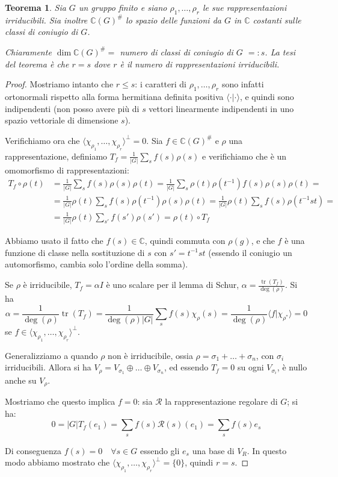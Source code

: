 \documentclass[11pt]{article}
\theoremstyle{plain}
\newtheorem{thm}{Teorema}[section]
\theoremstyle{definition}
\theoremstyle{remark}
\newcommand{\C}{\mathbb{C}}
\newcommand{\dsum}{\displaystyle\sum}
\DeclareMathOperator{\tr}{tr}
\begin{document}
\begin{thm} Sia $G$ un gruppo finito e siano $\rho_1, \ldots , \rho_r$ le sue rappresentazioni irriducibili. Sia inoltre $\C(G)^{\#}$ lo spazio delle funzioni da $G$ in $\C$ costanti sulle classi di coniugio di $G$.

Chiaramente $\dim \C(G)^\# = $ numero di classi di coniugio di $G$ $=: s$. La tesi del teorema è che $r = s$ dove $r$ è il numero di rappresentazioni irriducibili.
\end{thm}
\begin{proof}
Mostriamo intanto che $r \leq s$: i caratteri di $\rho_1, \ldots , \rho_r$ sono infatti ortonormali rispetto alla forma hermitiana
definita positiva $\langle \cdot | \cdot \rangle$, e quindi sono indipendenti (non posso avere più di $s$ vettori linearmente indipendenti
in uno spazio vettoriale di dimensione $s$).

Verifichiamo ora che $\langle \chi_{\rho_1}, \ldots, \chi_{\rho_r} \rangle ^{\perp} = {0}$. Sia $f \in \C(G)^\#$ e $\rho$ una rappresentazione,
definiamo $T_f= \frac{1}{|G|}\dsum_s f(s)\rho(s)$ e verifichiamo che è un omomorfismo di rappresentazioni:
\begin{align*}
 T_f \circ \rho(t) &= \frac{1}{|G|}\dsum_s f(s)\rho(s) \rho(t) = \frac{1}{|G|}\dsum_s \rho(t) \rho(t^{-1}) f(s)\rho(s) \rho(t) = \\
 &= \frac{1}{|G|}\rho(t) \dsum_s f(s) \rho(t^{-1}) \rho(s) \rho(t) = \frac{1}{|G|}\rho(t) \dsum_s f(s) \rho(t^{-1}st) =  \\
 &= \frac{1}{|G|}\rho(t) \dsum_{s'} f(s') \rho(s')= \rho(t) \circ T_f
\end{align*}

Abbiamo usato il fatto che $f(s)\in \C$, quindi commuta con $\rho(g)$, e che $f$ è una funzione di classe nella
sostituzione di $s$ con $s'= t^{-1}st$ (essendo il coniugio un automorfismo, cambia solo l'ordine della somma).

Se $\rho$ è irriducibile, $T_f= \alpha I$ è uno scalare per il lemma di Schur, $\alpha= \frac{\tr(T_f)}{\deg(\rho)}$.
Si ha $$\alpha =\frac{1}{\deg(\rho)}\tr(T_f)=\frac{1}{\deg(\rho)|G|}\dsum_s f(s) \chi_\rho(s)=
\frac{1}{\deg(\rho)} \langle f | \chi_{\rho^*} \rangle = 0$$ se $f \in \langle \chi_{\rho_1}, \ldots, \chi_{\rho_r} \rangle ^{\perp}$.

Generalizziamo a quando $\rho$ non è irriducibile, ossia $\rho = \sigma_1+ \ldots + \sigma_n$, con $\sigma_i$ irriducibili. Allora
si ha $V_\rho = V_{\sigma_1}  \oplus \ldots \oplus V_{\sigma_n}$, ed essendo $T_f=0 $ su ogni $V_{\sigma_i}$, è nullo anche su $V_\rho$.

Mostriamo che questo implica $f=0$: sia $\mathcal{R}$ la rappresentazione regolare di $G$; si ha:
$$ 0= |G| T_f (e_1) = \dsum_s f(s) \mathcal{R}(s)(e_1) = \dsum_s f(s) e_s $$

Di conseguenza $f(s)=0 \quad \forall s \in G$ essendo gli $e_s$ una base di $V_R$.
In questo modo abbiamo mostrato che $\langle \chi_{\rho_1}, \ldots, \chi_{\rho_r} \rangle ^{\perp} = \{0\}$, quindi $r=s$.
\end{proof}
\end{document}
